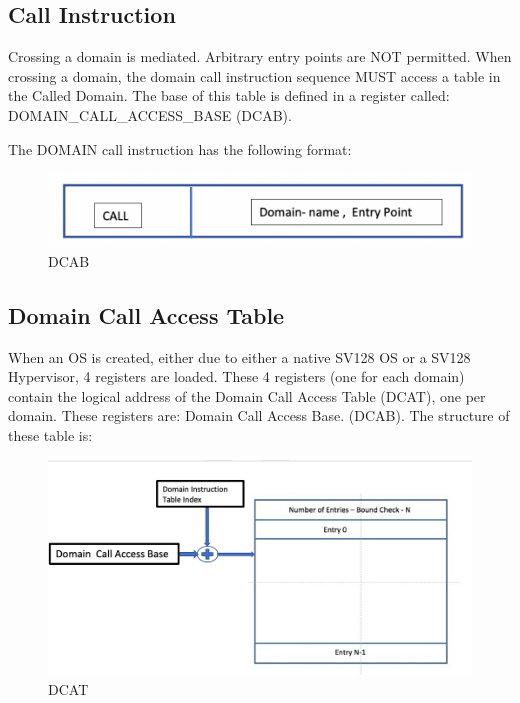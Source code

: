 \documentclass{article}
\begin{document}
\begin{appendices}
\subsection{Call Instruction}

Crossing a domain is mediated.  Arbitrary entry  points are NOT  permitted. When crossing a domain,  the domain call instruction sequence MUST access a table in the Called Domain. The base of this table is defined in a register called: DOMAIN\_CALL\_ACCESS\_BASE (DCAB). 


The DOMAIN call instruction has the following format:

\begin{figure}[h]
\includegraphics[width=\textwidth]{figures/DCAB.png}
\caption{DCAB}
\label{fig:DCAB}
\end{figure}

\subsection{Domain Call Access Table}

When an OS is created, either due to either a native SV128 OS or a SV128 Hypervisor,  4 registers are loaded.  These 4 registers (one for each domain)  contain the logical address of the Domain Call Access Table (DCAT),  one per domain.   These registers are:  Domain Call Access Base.  (DCAB). The structure of  these table is:

\begin{figure}[h]
\includegraphics[width=\textwidth]{figures/DCAT.png}
\caption{DCAT}
\label{fig:DCAT}
\end{figure}


\end{appendices}
\end{document}

